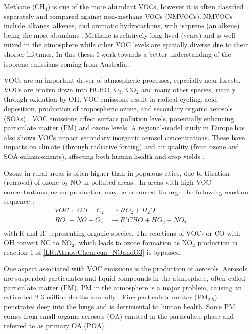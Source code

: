   Methane (CH$_4$) is one of the more abundant VOCs, however it is often classified separately and compared against non-methane VOCs (NMVOCs).
  NMVOCs include alkanes, alkenes, and aromatic hydrocarbons, with isoprene (an alkene) being the most abundant \parencite{Guenther1995}.
  Methane is relatively long lived (years) and is well mixed in the atmosphere while other VOC levels are spatially diverse due to their shorter lifetimes.
  In this thesis I work towards a better understanding of the isoprene emissions coming from Australia.

  VOCs are an important driver of atmospheric processes, especially near forests.
  VOCs are broken down into HCHO, O$_3$, CO$_2$ and many other species, mainly through oxidation by OH.
  VOC emissions result in radical cycling, acid deposition, production of tropospheric ozone, and secondary organic aerosols (SOAs) \parencite{Atkinson2000, Kanakidou2005}.
  VOC emissions affect surface pollution levels, potentially enhancing particulate matter (PM) and ozone levels.
  A regional-model study in Europe \parencite{Aksoyoglu2017} has also shown VOCs impact secondary inorganic aerosol concentrations.
  These have impacts on climate (through radiative forcing) and air quality (from ozone and SOA enhancements), affecting both human health and crop yields \parencite{IPCC_Chapter2, Avnery2011, Lelieveld2015}.
  
  Ozone in rural areas is often higher than in populous cities, due to titration (removal) of ozone by NO in polluted areas \parencite{Cooper2014,Monks2015}.
  In areas with high VOC concentrations, ozone production may be enhanced through the following reaction sequence \parencite{Sillman1999}:
  \begin{equation}
    \begin{aligned}
      VOC + OH + O_2   & \to RO_2 + H_2O       && \\%
      RO_2 + NO + O_2  & \to R'CHO+HO_2+NO_2   && \\%
    \end{aligned}
    \label{LR:VOCs:eqn_VOCandNO}
  \end{equation}
  with R and R' representing organic species.
  The reactions of VOCs or CO with OH convert NO to NO$_2$, which leads to ozone formation as NO$_2$ production in reaction 1 of \ref{LR:Atmos:Chem:eqn_NOandO3} is bypassed.
  
  One aspect associated with VOC emissions is the production of aerosols.
  Aerosols are suspended particulates and liquid compounds in the atmosphere, often called particulate matter (PM).
  PM in the atmosphere is a major problem, causing an estimated 2-3 million deaths annually \parencite{Hoek2013, Krewski2009, Silva2013, Lelieveld2015}. 
  Fine particulate matter (PM$_{2.5}$) penetrates deep into the lungs and is detrimental to human health.
  Some PM comes from small organic aerosols (OA) emitted in the particulate phase and referred to as primary OA (POA).
  

